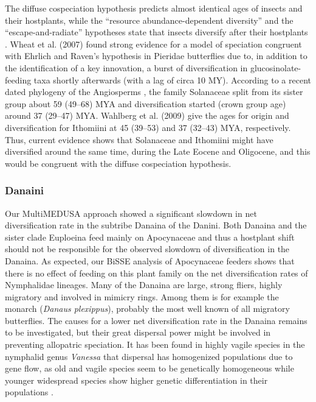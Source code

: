 \documentclass[10pt]{article}
\begin{document}
The diffuse cospeciation hypothesis predicts almost identical ages of
insects and their hostplants, while the ``resource abundance-dependent
diversity'' and the ``escape-and-radiate'' hypotheses state that insects
diversify after their hostplants \cite{nyman2012,ehrlich1964,janz2011}.
Wheat et al. (2007)
\cite{wheat2007} found strong evidence for a model of speciation congruent with
Ehrlich and Raven's hypothesis in Pieridae butterflies due to, in
addition to the identification of a key innovation, a burst of
diversification in glucosinolate-feeding taxa shortly afterwards (with a
lag of circa 10 MY). According to a recent dated phylogeny of
the Angiosperms \cite{bell2010}, the family Solanaceae split from its sister
group about 59 (49--68) MYA and diversification started (crown group
age) around 37 (29--47) MYA. Wahlberg et al. (2009) \cite{wahlberg2009} give the
ages for origin and diversification for Ithomiini at 45 (39--53) and 37
(32--43) MYA, respectively. Thus, current evidence shows that Solanaceae
and Ithomiini might have diversified around the same time, during the
Late Eocene and Oligocene, and this would be congruent with the diffuse
cospeciation hypothesis.

\subsubsection*{Danaini}
Our MultiMEDUSA approach showed a significant slowdown in net
diversification rate in the subtribe Danaina of the Danini. Both Danaina
and the sister clade Euploeina feed mainly on Apocynaceae and thus a
hostplant shift should not be responsible for the observed slowdown of
diversification in the Danaina. As expected, our BiSSE analysis of
Apocynaceae feeders shows that there is no effect of feeding on this
plant family on the net diversification rates of Nymphalidae lineages.
Many of the Danaina are large, strong fliers, highly migratory and
involved in mimicry rings. Among them is for example the monarch
(\emph{Danaus plexippus}), probably the most well known of all migratory
butterflies. The causes for a lower net diversification rate in the
Danaina remains to be investigated, but their great dispersal power
might be involved in preventing allopatric speciation. It has been found
in highly vagile species in the nymphalid genus \emph{Vanessa} that
dispersal has homogenized populations due to gene flow, as old and
vagile species seem to be genetically homogeneous while younger
widespread species show higher genetic differentiation in their
populations \cite{wahlberg2011}.
\end{document}
